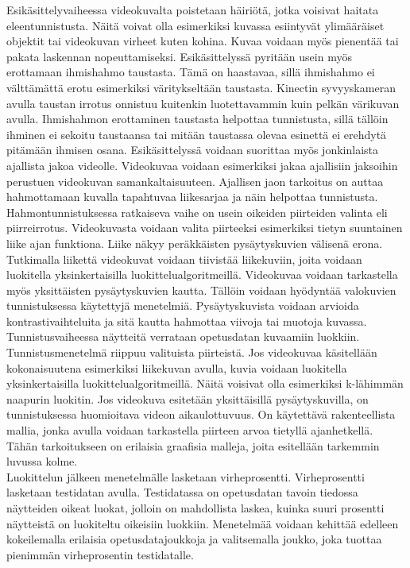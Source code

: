 Esikäsittelyvaiheessa videokuvalta poistetaan häiriötä, jotka voisivat haitata eleentunnistusta.
Näitä voivat olla esimerkiksi kuvassa esiintyvät ylimääräiset objektit tai videokuvan virheet kuten kohina.
Kuvaa voidaan myös pienentää tai pakata laskennan nopeuttamiseksi. Esikäsittelyssä pyritään usein myös erottamaan ihmishahmo taustasta. Tämä on haastavaa, sillä
ihmishahmo ei välttämättä erotu esimerkiksi väritykseltään taustasta. Kinectin syvyyskameran avulla taustan irrotus onnistuu kuitenkin luotettavammin kuin pelkän 
värikuvan avulla. Ihmishahmon erottaminen taustasta helpottaa tunnistusta, sillä tällöin ihminen ei sekoitu taustaansa tai mitään taustassa olevaa
esinettä ei erehdytä pitämään ihmisen osana. Esikäsittelyssä voidaan suorittaa myös jonkinlaista ajallista jakoa videolle. Videokuvaa
voidaan esimerkiksi jakaa ajallisiin jaksoihin perustuen videokuvan samankaltaisuuteen. Ajallisen jaon 
tarkoitus on auttaa hahmottamaan kuvalla tapahtuvaa liikesarjaa ja näin helpottaa tunnistusta. \citep{6239178} \\

Hahmontunnistuksessa ratkaiseva vaihe on usein oikeiden piirteiden valinta eli piirreirrotus. Videokuvasta voidaan valita piirteeksi esimerkiksi 
tietyn suuntainen liike ajan funktiona. Liike näkyy peräkkäisten pysäytyskuvien välisenä erona. Tutkimalla liikettä
videokuvat voidaan tiivistää liikekuviin, joita voidaan luokitella yksinkertaisilla luokittelualgoritmeillä. 
Videokuvaa voidaan tarkastella myös yksittäisten pysäytyskuvien kautta. 
Tällöin voidaan hyödyntää valokuvien tunnistuksessa käytettyjä menetelmiä.
Pysäytyskuvista voidaan arvioida kontrastivaihteluita ja sitä kautta hahmottaa viivoja tai muotoja kuvassa. \citep{6239178}  \\

Tunnistusvaiheessa näytteitä verrataan opetusdatan kuvaamiin luokkiin. Tunnistusmenetelmä riippuu valituista piirteistä.
Jos videokuvaa käsitellään kokonaisuutena esimerkiksi liikekuvan avulla, kuvia voidaan luokitella yksinkertaisilla luokittelualgoritmeillä. 
Näitä voisivat olla esimerkiksi k-lähimmän naapurin luokitin. Jos videokuva esitetään yksittäisillä pysäytyskuvilla, 
on tunnistuksessa huomioitava videon aikaulottuvuus. On käytettävä rakenteellista mallia, jonka avulla voidaan tarkastella piirteen arvoa
tietyllä ajanhetkellä. Tähän tarkoitukseen on erilaisia graafisia malleja, joita esitellään tarkemmin luvussa kolme. \citep{6239178} \\

Luokittelun jälkeen menetelmälle lasketaan virheprosentti. Virheprosentti lasketaan testidatan avulla.
Testidatassa on opetusdatan tavoin tiedossa näytteiden oikeat luokat, jolloin on mahdollista laskea, kuinka suuri prosentti
näytteistä on luokiteltu oikeisiin luokkiin. Menetelmää voidaan kehittää edelleen kokeilemalla erilaisia
opetusdatajoukkoja ja valitsemalla joukko, joka tuottaa pienimmän virheprosentin testidatalle. \citep{6239178} 

